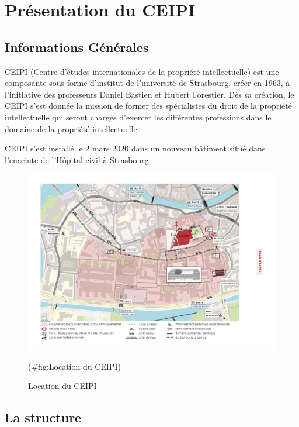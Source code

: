 \documentclass[
  oneside]{book}
\begin{document}
\hypertarget{pruxe9sentation-du-ceipi}{%
\chapter{Présentation du CEIPI}\label{pruxe9sentation-du-ceipi}}

\hypertarget{informations-guxe9nuxe9rales}{%
\section{Informations Générales}\label{informations-guxe9nuxe9rales}}

CEIPI (Centre d'études internationales de la propriété intellectuelle) est une composante sous forme d'institut de l'université de Strasbourg, créer en 1963, à l'initiative des professeurs Daniel Bastien et Hubert Forestier. Dès sa création, le CEIPI s'est donnée la mission de former des spécialistes du droit de la propriété intellectuelle qui seront chargés d'exercer les différentes professions dans le domaine de la propriété intellectuelle.

CEIPI s'est installé le 2 mars 2020 dans un nouveau bâtiment situé dans l'enceinte de l'Hôpital civil à Strasbourg

\begin{figure}

{\centering \includegraphics[width=0.8\linewidth]{images/Location_du_CEIPI} 

}

\caption{Location du CEIPI}(\#fig:Location du CEIPI)
\end{figure}

\hypertarget{la-structure}{%
\section{La structure}\label{la-structure}}
\end{document}
